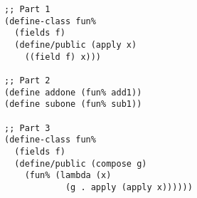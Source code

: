 \documentclass[12pt]{article}                   %
\newenvironment{solution}{}{}
\begin{document}
\begin{problem}
\begin{solution}
\begin{verbatim}
;; Part 1
(define-class fun%
  (fields f)
  (define/public (apply x)
    ((field f) x)))

;; Part 2
(define addone (fun% add1))
(define subone (fun% sub1))

;; Part 3
(define-class fun%
  (fields f)
  (define/public (compose g)
    (fun% (lambda (x)
            (g . apply (apply x))))))
\end{verbatim}

\end{solution}

\newpage
\ifrubric{}
\newpage
\fi

\end{problem}
\end{document}
